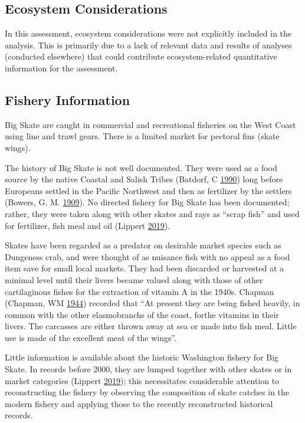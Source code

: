 \documentclass[12pt,]{article}
\begin{document}
\hypertarget{ecosystem-considerations-1}{%
\subsection{Ecosystem Considerations}\label{ecosystem-considerations-1}}

In this assessment, ecosystem considerations were not explicitly
included in the analysis. This is primarily due to a lack of relevant
data and results of analyses (conducted elsewhere) that could contribute
ecosystem-related quantitative information for the assessment.

\hypertarget{fishery-information}{%
\subsection{Fishery Information}\label{fishery-information}}

Big Skate are caught in commercial and recreational fisheries on the
West Coast using line and trawl gears. There is a limited market for
pectoral fins (skate wings).

The history of Big Skate is not well documented. They were used as a
food source by the native Coastal and Salish Tribes (Batdorf, C
\protect\hyperlink{ref-Batdorf1990}{1990}) long before Europeans settled
in the Pacific Northwest and then as fertilizer by the settlers (Bowers,
G. M. \protect\hyperlink{ref-Bowers1909}{1909}). No directed fishery for
Big Skate has been documented; rather, they were taken along with other
skates and rays as ``scrap fish'' and used for fertilizer, fish meal and
oil (Lippert \protect\hyperlink{ref-GregLippert}{2019}).

Skates have been regarded as a predator on desirable market species such
as Dungeness crab, and were thought of as nuisance fish with no appeal
as a food item save for small local markets. They had been discarded or
harvested at a minimal level until their livers became valued along with
those of other cartilaginous fishes for the extraction of vitamin A in
the 1940s. Chapman (Chapman, WM
\protect\hyperlink{ref-Chapman1944}{1944}) recorded that ``At present
they are being fished heavily, in common with the other elasmobranchs of
the coast, forthe vitamins in their livers. The carcasses are either
thrown away at sea or made into fish meal. Little use is made of the
excellent meat of the wings''.

Little information is available about the historic Washington fishery
for Big Skate. In records before 2000, they are lumped together with
other skates or in market categories (Lippert
\protect\hyperlink{ref-GregLippert}{2019}); this necessitates
considerable attention to reconstructing the fishery by observing the
composition of skate catches in the modern fishery and applying those to
the recently reconstructed historical records.
\end{document}
